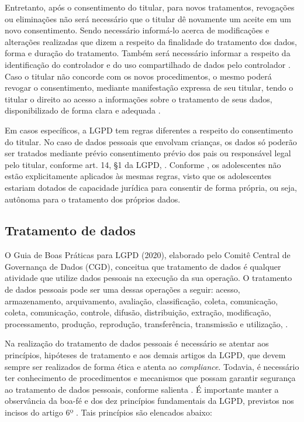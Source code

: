 \documentclass[
	12pt,				%
	openright,			%
	oneside,			%
	a4paper,			%
	english,			%
	french,				%
	spanish,			%
	brazil,				%
	]{abntex2}
\begin{document}
Entretanto, após o consentimento do titular, para novos tratamentos, revogações ou eliminações não será necessário que o titular dê novamente um aceite em um novo consentimento. Sendo necessário informá-lo acerca de modificações e alterações realizadas que dizem a respeito da finalidade do tratamento dos dados, forma e duração do tratamento. Também será necessário informar a respeito da identificação do controlador e do uso compartilhado de dados pelo controlador \cite{LimaMaldonado2020}. Caso o titular não concorde com os novos procedimentos, o mesmo poderá revogar o consentimento, mediante manifestação expressa de seu titular, tendo o titular o direito ao acesso a informações sobre o tratamento de seus dados, disponibilizado de forma clara e adequada \cite{Cots2019}.

Em casos específicos, a LGPD tem regras diferentes a respeito do consentimento do titular. No caso de dados pessoais que envolvam crianças, os dados só poderão ser tratados mediante prévio consentimento prévio dos pais ou responsável legal pelo titular, conforme art. 14, §1 da LGPD, \cite{01-01-LeiGeral}. Conforme , os adolescentes não estão explicitamente aplicados às mesmas regras, visto que os adolescentes estariam dotados de capacidade jurídica para consentir de forma própria, ou seja, autônoma para o tratamento dos próprios dados.
\subsection{Tratamento de dados}

O Guia de Boas Práticas para LGPD (2020), elaborado pelo Comitê Central de Governança de Dados (CGD), conceitua que tratamento de dados é qualquer atividade que utilize dados pessoais na execução da sua operação. O tratamento de dados pessoais pode ser uma dessas operações a seguir: acesso, armazenamento, arquivamento, avaliação, classificação, coleta, comunicação, coleta, comunicação, controle, difusão, distribuição, extração, modificação, processamento, produção, reprodução, transferência, transmissão e utilização, \cite{01-01-LeiGeral}.

Na realização do tratamento de dados pessoais é necessário se atentar aos princípios, hipóteses de tratamento e aos demais artigos da LGPD, que devem sempre ser realizados de forma ética e atenta ao \textit{compliance}. Todavia, é necessário ter conhecimento de procedimentos e mecanismos que possam garantir segurança ao tratamento de dados pessoais, conforme salienta . É importante manter a observância da boa-fé e dos dez princípios fundamentais da LGPD, previstos nos incisos do artigo 6º \cite{01-01-LeiGeral}. Tais princípios são elencados abaixo:
\end{document}
